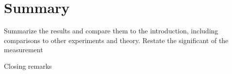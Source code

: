 \section{Summary}\label{sec:NuMMConclusion}

Summarize the results and compare them to the introduction, including comparisons to other experiments and theory. Restate the significant of the measurement

Closing remarks